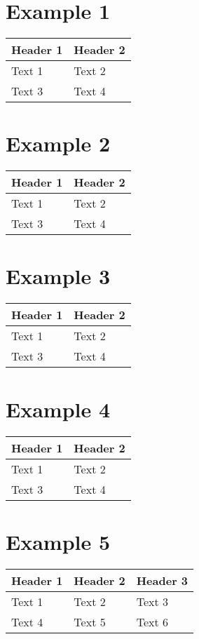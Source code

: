 \section{Example 1}\label{example-1}

\begin{longtable}[c]{@{}ll@{}}
\toprule
Header 1 & Header 2\tabularnewline
\midrule
\endhead
Text 1 & Text 2\tabularnewline
Text 3 & Text 4\tabularnewline
\bottomrule
\end{longtable}

\section{Example 2}\label{example-2}

\begin{longtable}[c]{@{}ll@{}}
\toprule
Header 1 & Header 2\tabularnewline
\midrule
\endhead
Text 1 & Text 2\tabularnewline
Text 3 & Text 4\tabularnewline
\bottomrule
\end{longtable}

\section{Example 3}\label{example-3}

\begin{longtable}[c]{@{}ll@{}}
\toprule
Header 1 & Header 2\tabularnewline
\midrule
\endhead
Text 1 & Text 2\tabularnewline
Text 3 & Text 4\tabularnewline
\bottomrule
\end{longtable}

\section{Example 4}\label{example-4}

\begin{longtable}[c]{@{}ll@{}}
\toprule
Header 1 & Header 2\tabularnewline
\midrule
\endhead
Text 1 & Text 2\tabularnewline
Text 3 & Text 4\tabularnewline
\bottomrule
\end{longtable}

\section{Example 5}\label{example-5}

\begin{longtable}[c]{@{}lll@{}}
\toprule
\textbf{Header 1} & Header 2 & Header 3\tabularnewline
\midrule
\endhead
Text 1\autocite{source} & Text 2 & Text 3\tabularnewline
Text 4 & Text 5 & Text 6\tabularnewline
\bottomrule
\end{longtable}

